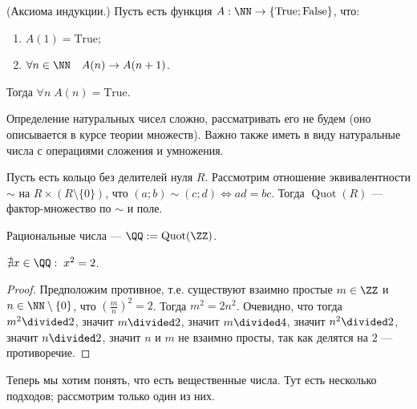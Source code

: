 \documentclass[12pt,a4paper]{article}
\DeclareMathOperator{\Quot}{Quot}
\newcommand{\True}{\mathrm{True}}
\newcommand{\False}{\mathrm{False}}
\begin{document}
    \begin{definition}
        (Аксиома индукции.) Пусть есть функция $A: \NN \to \{\True; \False\}$, что:
        \begin{multicols}{2}
            \begin{enumerate}
                \item $A(1) = \True$;
                \item $\forall n \in \NN\quad A(n) \rightarrow A(n+1)$.
            \end{enumerate}
        \end{multicols}
        Тогда $\forall n\; A(n) = \True$.
    \end{definition}

    Определение натуральных чисел сложно, рассматривать его не будем (оно описывается в курсе теории множеств). Важно также иметь в виду натуральные числа с операциями сложения и умножения.

    \begin{definition}
        Пусть есть кольцо без делителей нуля $R$. Рассмотрим отношение эквивалентности $\sim$ на $R \times (R\setminus \{0\})$, что $(a; b) \sim (c; d) \Leftrightarrow ad = bc$. Тогда $\Quot(R)$ --- фактор-множество по $\sim$ и поле.
    \end{definition}

    \begin{definition}
        Рациональные числа --- $\QQ := \Quot(\ZZ)$.
    \end{definition}

    \begin{theorem}
        $\nexists x\in \QQ:\; x^2 = 2$.
    \end{theorem}

    \begin{proof}
        Предположим противное, т.е. существуют взаимно простые $m \in \ZZ$ и $n \in \NN\setminus\{0\}$, что $(\frac{m}{n})^2 = 2$. Тогда $m^2 = 2n^2$. Очевидно, что тогда $m^2 \divided 2$, значит $m\divided 2$, значит $m\divided 4$, значит $n^2 \divided 2$, значит $n \divided 2$, значит $n$ и $m$ не взаимно просты, так как делятся на $2$ --- противоречие.
    \end{proof}

    Теперь мы хотим понять, что есть вещественные числа. Тут есть несколько подходов; рассмотрим только один из них.
\end{document}
